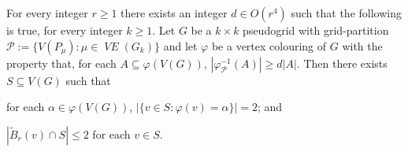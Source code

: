 \documentclass{patmorin}
\DeclareMathOperator{\VE}{\mathit{VE}}
\begin{document}
\begin{lem}
  For every integer $r\ge 1$ there exists an integer $d\in O(r^4)$ such that the following is true, for every integer $k\ge 1$.
  Let $G$ be a $k\times k$ pseudogrid with grid-partition $\mathcal{P}:=\{V(P_\mu):\mu\in\VE(G_k)\}$ and let $\varphi$ be a vertex colouring of $G$ with the property that, for each $A\subseteq\varphi(V(G))$, $|\varphi_{\mathcal{P}}^{-1}(A)|\ge d|A|$.
  Then there exists $S\subseteq V(G)$ such that
  \begin{compactenum}[(i)]
    \item \label{hits_both} for each $\alpha\in\varphi(V(G))$, $|\{v\in S:\varphi(v)=\alpha\}|= 2$; and
    \item \label{spread_out} $|\tilde{B}_r(v)\cap S|\le 2$ for each $v\in S$.
  \end{compactenum}
\end{lem}
\end{document}
